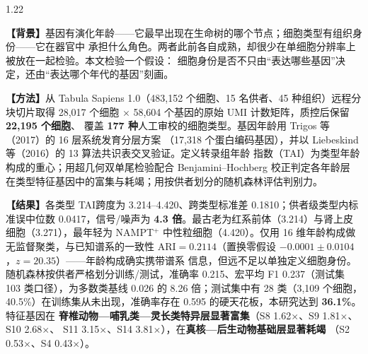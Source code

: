 \documentclass[UTF8, a4paper, 11pt]{ctexart}
\newcommand{\tai}{\textsc{TAI}}
\begin{document}
\begin{spacing}{1.22}
\small

\par
\vspace{0.3em}

\noindent
\textbf{【背景】}基因有演化年龄——它最早出现在生命树的哪个节点；细胞类型有组织身份——它在器官中
承担什么角色。两者此前各自成熟，却很少在单细胞分辨率上被放在一起检验。本文检验一个假设：
细胞身份是否不只由“表达哪些基因”决定，还由“表达哪个年代的基因”刻画。

\vspace{0.2em}\noindent
\textbf{【方法】}从 Tabula Sapiens 1.0（483,152 个细胞、15 名供者、45 种组织）远程分块切片取得
28,017 个细胞 $\times$ 58,604 个基因的原始 UMI 计数矩阵，质控后保留 \textbf{22,195 个细胞}、
覆盖 \textbf{177 种}人工审校的细胞类型。基因年龄用 Trigos 等（2017）的 16 层系统发育分层方案
（17,318 个蛋白编码基因），并以 Liebeskind 等（2016）的 13 算法共识表交叉验证。定义转录组年龄
指数（\tai）为类型年龄构成的重心；用超几何双单尾检验配合 Benjamini--Hochberg 校正判定各年龄层
在类型特征基因中的富集与耗竭；用按供者划分的随机森林评估判别力。

\vspace{0.2em}\noindent
\textbf{【结果】}各类型 \tai 跨度为 3.214--4.420、跨类型标准差 0.1810；供者级类型内标准误中位数
0.0417，信号/噪声为 \textbf{4.3 倍}。最古老为红系前体（3.214）与肾上皮细胞（3.271），最年轻为
NAMPT$^{+}$ 中性粒细胞（4.420）。仅用 16 维年龄构成做无监督聚类，与已知谱系的一致性
$\mathrm{ARI} = 0.2114$（置换零假设 $-0.0001 \pm 0.0104$，$z = 20.35$）——年龄构成确实携带谱系
信息，但远不足以单独定义细胞身份。随机森林按供者严格划分训练/测试，准确率 0.215、宏平均
F1 0.237（测试集 103 类口径），为多数类基线 0.026 的 8.26 倍；测试集中有 28 类（3,109 个细胞，
40.5\%）在训练集从未出现，准确率存在 0.595 的硬天花板，本研究达到 \textbf{36.1\%}。特征基因在
\textbf{脊椎动物—哺乳类—灵长类特异层显著富集}（S8 1.62$\times$、S9 1.81$\times$、S10 2.68$\times$、
S11 3.15$\times$、S14 3.81$\times$），在\textbf{真核—后生动物基础层显著耗竭}
（S2 0.53$\times$、S4 0.43$\times$）。


\end{spacing}
\end{document}
